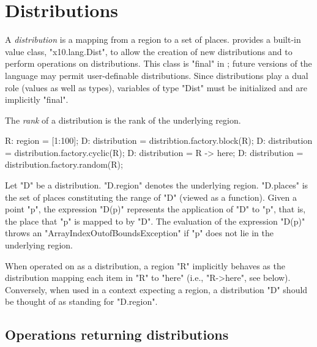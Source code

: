 \section{Distributions}\label{XtenDistributions}

A {\em distribution} is a mapping from a region to a set of places.
{}\Xten{} provides a built-in value class, \xcd"x10.lang.Dist", to allow the creation of new distributions and
to perform operations on distributions. This class is \xcd"final" in
{}\XtenCurrVer; future versions of the language may permit
user-definable distributions. Since distributions play a dual role
(values as well as types), variables of type \xcd"Dist" must
be initialized and are implicitly \xcd"final".

The {\em rank} of a distribution is the rank of the underlying region.



\begin{xten}
R: region = [1:100];
D: distribution = distribtion.factory.block(R);
D: distribution = distribution.factory.cyclic(R);
D: distribution = R -> here;
D: distribution = distribution.factory.random(R);
\end{xten}

Let \xcd"D" be a distribution. \xcd"D.region" denotes the underlying
region. \xcd"D.places" is the set of places constituting the range of
\xcd"D" (viewed as a function). Given a point \xcd"p", the expression
\xcd"D(p)" represents the application of \xcd"D" to \xcd"p", that is,
the place that \xcd"p" is mapped to by \xcd"D". The evaluation of the
expression \xcd"D(p)" throws an \xcd"ArrayIndexOutofBoundsException"
if \xcd"p" does not lie in the underlying region.

When operated on as a distribution, a region \xcd"R" implicitly
behaves as the distribution mapping each item in \xcd"R" to \xcd"here"
(i.e., \xcd"R->here", see below). Conversely, when used in a context
expecting a region, a distribution \xcd"D" should be thought of as
standing for \xcd"D.region".

{}

\subsection{Operations returning distributions}

